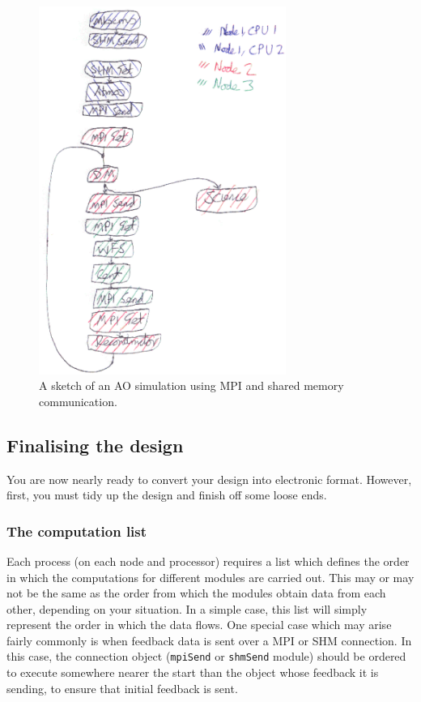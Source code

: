 \documentclass{article}
\newcommand{\mod}[1]{\texttt{#1}}
\begin{document}
\begin{figure}
\includegraphics[height=12cm]{pics/aosimsketchcommstrans.eps}
\caption{A sketch of an AO simulation using MPI and shared memory
communication.}
\label{fig:simcomms}
\end{figure}

\subsection{Finalising the design}
You are now nearly ready to convert your design into electronic
format.  However, first, you must tidy up the design and finish off
some loose ends.

\subsubsection{The computation list}
Each process (on each node and processor) requires a list which
defines the order in which the computations for different modules are
carried out.  This may or may not be the same as the order from which
the modules obtain data from each other, depending on your situation.
In a simple case, this list will simply represent the order in which
the data flows.  One special case which may arise fairly commonly is
when feedback data is sent over a MPI or SHM connection.  In this
case, the connection object (\mod{mpiSend} or \mod{shmSend} module)
should be ordered to execute somewhere nearer the start than the
object whose feedback it is sending, to ensure that initial feedback
is sent.
\end{document}
